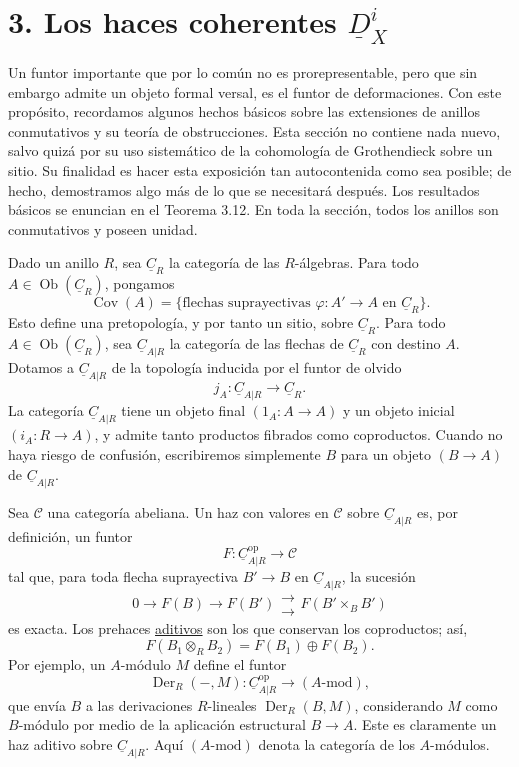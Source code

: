 
\section*{3. Los haces coherentes $\underline D_X^i$}

Un funtor importante que por lo común no es prorepresentable, pero que
sin embargo admite un objeto formal versal, es el funtor de deformaciones.
Con este propósito, recordamos algunos hechos básicos sobre las extensiones
de anillos conmutativos y su teoría de obstrucciones. Esta sección no
contiene nada nuevo, salvo quizá por su uso sistemático de la cohomología de
Grothendieck sobre un sitio. Su finalidad es hacer esta exposición tan
autocontenida como sea posible; de hecho, demostramos algo más de lo que se
necesitará después. Los resultados básicos se enuncian en el Teorema 3.12.
En toda la sección, todos los anillos son conmutativos y poseen unidad.


Dado un anillo $R$, sea $\underline C_R$ la categoría de las
$R$-álgebras. Para todo $A\in\operatorname{Ob}(\underline C_R)$,
pongamos
\[
 \operatorname{Cov}(A)=
 \{\text{flechas suprayectivas }\varphi:A'\longrightarrow A
   \text{ en }\underline C_R\}.
\]
Esto define una pretopología, y por tanto un sitio, sobre
$\underline C_R$. Para todo $A\in\operatorname{Ob}(\underline C_R)$,
sea $\underline C_{A|R}$ la categoría de las flechas de
$\underline C_R$ con destino $A$. Dotamos a $\underline C_{A|R}$ de la
topología inducida por el funtor de olvido
\[
 j_A:\underline C_{A|R}\longrightarrow\underline C_R.
\]
La categoría $\underline C_{A|R}$ tiene un objeto final
$(1_A:A\longrightarrow A)$ y un objeto inicial
$(i_A:R\longrightarrow A)$, y admite tanto productos fibrados como
coproductos. Cuando no haya riesgo de confusión, escribiremos simplemente
$B$ para un objeto $(B\longrightarrow A)$ de $\underline C_{A|R}$.

Sea $\mathscr C$ una categoría abeliana. Un haz con valores en $\mathscr C$
sobre $\underline C_{A|R}$ es, por definición, un funtor
\[
 F:\underline C_{A|R}^{\mathrm{op}}\longrightarrow\mathscr C
\]
tal que, para toda flecha suprayectiva $B'\longrightarrow B$ en
$\underline C_{A|R}$, la sucesión
\[
 0\longrightarrow F(B)\longrightarrow F(B')
 \mathrel{\substack{\longrightarrow\\[-.6ex]\longrightarrow}}
 F(B'\mathbin{\times_B}B')
\]
es exacta. Los prehaces \underline{aditivos} son los que conservan los
coproductos; así,
\[
 F(B_1\otimes_R B_2)=F(B_1)\oplus F(B_2).
\]
Por ejemplo, un $A$-módulo $M$ define el funtor
\[
 \operatorname{Der}_R(-,M):
 \underline C_{A|R}^{\mathrm{op}}\longrightarrow(A\text{-mod}),
\]
que envía $B$ a las derivaciones $R$-lineales
$\operatorname{Der}_R(B,M)$, considerando $M$ como $B$-módulo por medio
de la aplicación estructural $B\longrightarrow A$. Este es claramente un
haz aditivo sobre $\underline C_{A|R}$. Aquí $(A\text{-mod})$ denota la
categoría de los $A$-módulos.

